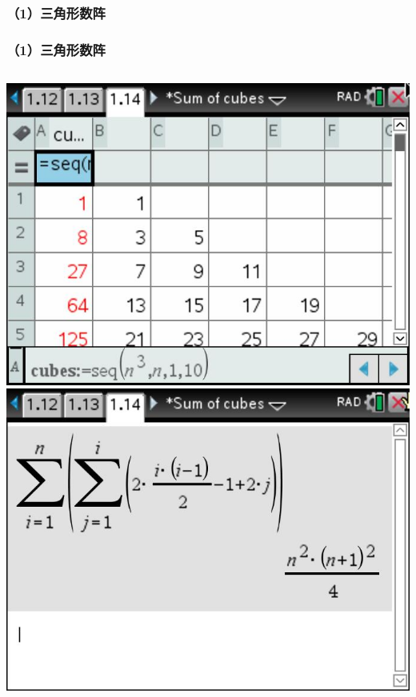 \documentclass[aspectratio=169]{beamer}
\begin{document}
\subsubsection{（1）三角形数阵}
       \begin{frame}
      \frametitle{（1）三角形数阵}
      \begin{columns}
      	\includegraphics[scale=0.3]{三角形数阵.jpg}
      	\vspace{2cm}
      	\includegraphics[scale=0.3]{三角形数阵和式.jpg}
      	\vspace{2cm}
      \end{columns}      
  \end{frame}
     
\end{document}
